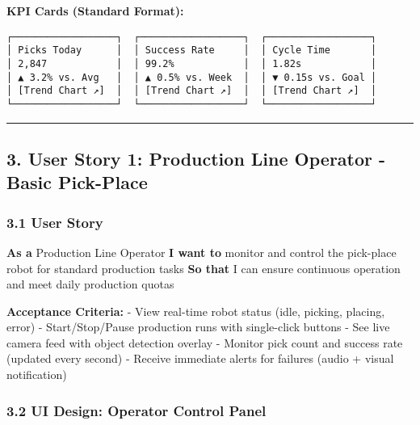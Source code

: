 \documentclass[
]{article}
\begin{document}
\textbf{KPI Cards (Standard Format):}

\begin{verbatim}
┌──────────────────┐  ┌──────────────────┐  ┌──────────────────┐
│ Picks Today      │  │ Success Rate     │  │ Cycle Time       │
│ 2,847            │  │ 99.2%            │  │ 1.82s            │
│ ▲ 3.2% vs. Avg   │  │ ▲ 0.5% vs. Week  │  │ ▼ 0.15s vs. Goal │
│ [Trend Chart ↗]  │  │ [Trend Chart ↗]  │  │ [Trend Chart ↗]  │
└──────────────────┘  └──────────────────┘  └──────────────────┘
\end{verbatim}

\begin{center}\rule{0.5\linewidth}{0.5pt}\end{center}

\hypertarget{user-story-1-production-line-operator---basic-pick-place}{%
\subsection{3. User Story 1: Production Line Operator - Basic
Pick-Place}\label{user-story-1-production-line-operator---basic-pick-place}}

\hypertarget{user-story}{%
\subsubsection{3.1 User Story}\label{user-story}}

\textbf{As a} Production Line Operator \textbf{I want to} monitor and
control the pick-place robot for standard production tasks \textbf{So
that} I can ensure continuous operation and meet daily production quotas

\textbf{Acceptance Criteria:} - View real-time robot status (idle,
picking, placing, error) - Start/Stop/Pause production runs with
single-click buttons - See live camera feed with object detection
overlay - Monitor pick count and success rate (updated every second) -
Receive immediate alerts for failures (audio + visual notification)

\hypertarget{ui-design-operator-control-panel}{%
\subsubsection{3.2 UI Design: Operator Control
Panel}\label{ui-design-operator-control-panel}}
\end{document}

